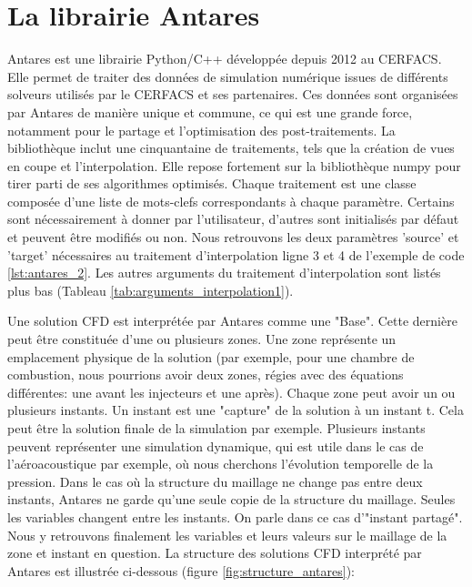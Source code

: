 \section{La librairie Antares}

Antares est une librairie Python/C++ développée depuis 2012 au CERFACS. Elle permet de traiter des données de simulation numérique issues de différents solveurs utilisés par le CERFACS et ses partenaires. Ces données sont organisées par Antares de manière unique et commune, ce qui est une grande force, notamment pour le partage et l'optimisation des post-traitements.
La bibliothèque inclut une cinquantaine de traitements, tels que la création de vues en coupe et l'interpolation.
Elle repose fortement sur la bibliothèque numpy pour tirer parti de ses algorithmes optimisés. %
Chaque traitement est une classe composée d'une liste de mots-clefs correspondants à chaque paramètre. Certains sont nécessairement à donner par l'utilisateur, d'autres sont initialisés par défaut et peuvent être modifiés ou non. Nous retrouvons les deux paramètres 'source' et 'target' nécessaires au traitement d'interpolation ligne 3 et 4 de l'exemple de code \ref{lst:antares_2}. Les autres arguments du traitement d'interpolation sont listés plus bas (Tableau \ref{tab:arguments_interpolation1}).

Une solution CFD est interprétée par Antares comme une "Base".
Cette dernière peut être constituée d'une ou plusieurs zones.
Une zone représente un emplacement physique de la solution (par exemple, pour une chambre de combustion, nous pourrions avoir deux zones, régies avec des équations différentes: une avant les injecteurs et une après). 
Chaque zone peut avoir un ou plusieurs instants.
Un instant est une "capture" de la solution à un instant t. Cela peut être la solution finale de la simulation par exemple. Plusieurs instants peuvent représenter une simulation dynamique, qui est utile dans le cas de l'aéroacoustique par exemple, où nous cherchons l'évolution temporelle de la pression.
Dans le cas où la structure du maillage ne change pas entre deux instants, Antares ne garde qu'une seule copie de la structure du maillage. Seules les variables changent entre les instants. On parle dans ce cas d'"instant partagé".\label{instants_partages}
Nous y retrouvons finalement les variables et leurs valeurs sur le maillage de la zone et instant en question.
La structure des solutions CFD interprété par Antares est illustrée ci-dessous (figure \ref{fig:structure_antares}):

